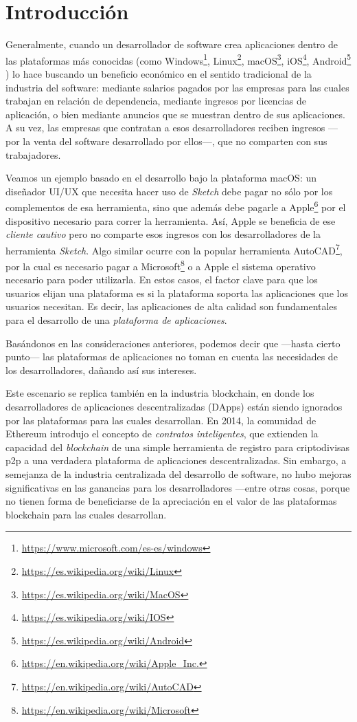 \section{Introducción}

\noindent
Generalmente, cuando un desarrollador de software crea aplicaciones dentro de las plataformas más conocidas (como
Windows\footnote{\url{https://www.microsoft.com/es-es/windows}}, Linux\footnote{\url{https://es.wikipedia.org/wiki/Linux}},
macOS\footnote{\url{https://es.wikipedia.org/wiki/MacOS}},
iOS\footnote{\url{https://es.wikipedia.org/wiki/IOS}},
Android\footnote{\url{https://es.wikipedia.org/wiki/Android}} \etc) lo hace buscando un beneficio económico en el sentido tradicional de la industria del software: mediante salarios pagados por las empresas para las cuales trabajan en relación de dependencia, mediante ingresos por licencias de aplicación, o bien mediante anuncios que se muestran dentro de sus aplicaciones. A su vez, las empresas que contratan a esos desarrolladores reciben ingresos —por la venta del software desarrollado por ellos—, que no comparten con sus trabajadores.

Veamos un ejemplo basado en el desarrollo bajo la plataforma macOS: un diseñador UI/UX que necesita hacer uso de \textit{Sketch} debe pagar no sólo por los complementos de esa herramienta, sino que además debe pagarle a Apple\footnote{\url{https://en.wikipedia.org/wiki/Apple_Inc.}}
por el dispositivo necesario para correr la herramienta. Así, Apple se beneficia de ese \textit{cliente cautivo} pero no comparte esos ingresos con los desarrolladores de la herramienta \textit{Sketch}. Algo similar ocurre con la popular herramienta AutoCAD\footnote{\url{https://en.wikipedia.org/wiki/AutoCAD}}, por la cual es necesario pagar a Microsoft\footnote{\url{https://en.wikipedia.org/wiki/Microsoft}} o a Apple el sistema operativo necesario para poder utilizarla. En estos casos, el factor clave para que los usuarios elijan una plataforma es si la plataforma soporta las aplicaciones que los usuarios necesitan. Es decir, las aplicaciones de alta calidad son fundamentales para el desarrollo de una \textit{plataforma de aplicaciones}.

Basándonos en las consideraciones anteriores, podemos decir que —hasta cierto punto— las plataformas de aplicaciones no toman en cuenta las necesidades de los desarrolladores, dañando así sus intereses.

Este escenario se replica también en la industria blockchain, en donde los desarrolladores de aplicaciones descentralizadas (DApps) están siendo ignorados por las plataformas para las cuales desarrollan. En 2014, la comunidad de Ethereum introdujo el concepto de \textit{contratos inteligentes}, que extienden la capacidad del \textit{blockchain} de una simple herramienta de registro para criptodivisas p2p a una verdadera plataforma de aplicaciones descentralizadas. Sin embargo, a semejanza de la industria centralizada del desarrollo de software, no hubo mejoras significativas en las ganancias para los desarrolladores —entre otras cosas, porque no tienen forma de beneficiarse de la apreciación en el valor de las plataformas blockchain para las cuales desarrollan.

